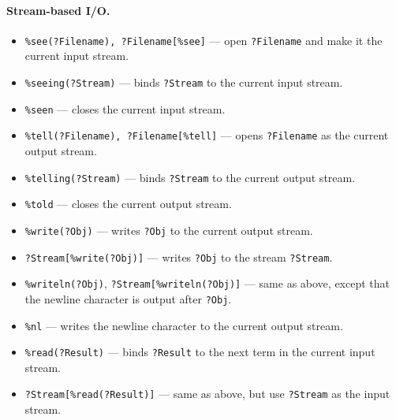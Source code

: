 \documentclass[11pt]{article}
\begin{document}
\paragraph{Stream-based I/O.}
\begin{itemize}
\item  {\tt \%see(?Filename), ?Filename[\%see]} --- open {\tt ?Filename} and make it the
  current input stream.
\item {\tt \verb|%|seeing(?Stream)} --- binds {\tt ?Stream} to the current input
  stream.
\item {\tt \verb|%|seen} --- closes the current input stream.
\item {\tt \%tell(?Filename), ?Filename[\%tell]} --- opens {\tt ?Filename} as the current output
  stream.
\item {\tt \verb|%|telling(?Stream)} --- binds {\tt ?Stream} to the current output
  stream. 
\item {\tt \verb|%|told} --- closes the current output stream.
\item {\tt \verb|%|write(?Obj)} --- writes {\tt ?Obj} to the current output stream.
\item {\tt ?Stream[\%write(?Obj)]} --- writes {\tt ?Obj} to the stream {\tt ?Stream}.
\item {\tt \verb|%|writeln(?Obj)}, {\tt ?Stream[\%writeln(?Obj)]} --- same as above,
  except that the newline character is output after {\tt ?Obj}.
\item {\tt \verb|%|nl} --- writes the newline character to the current output
  stream.
\item {\tt \verb|%|read(?Result)} --- binds {\tt ?Result} to the next term in the
  current input stream.
\item {\tt ?Stream[\%read(?Result)]} --- same as above, but use {\tt ?Stream}
  as the input stream.
\end{itemize}
\end{document}
